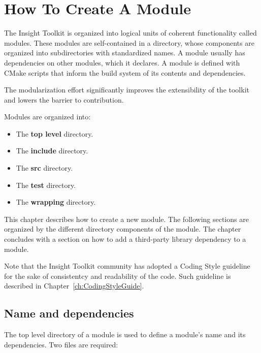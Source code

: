 \chapter{How To Create A Module}%
\label{chapter:CreateAModule}%

The Insight Toolkit is organized into logical units of coherent functionality called
modules. These modules are self-contained in a directory, whose components
are organized into subdirectories with standardized names. A module usually has
dependencies on other modules, which it declares. A module is defined with
CMake scripts that inform the build system of its contents and dependencies.

The modularization effort significantly improves the extensibility of the
toolkit and lowers the barrier to contribution.

Modules are organized into:

\begin{itemize}
  \item The \textbf{top level} directory.

  \item The \textbf{include} directory.

  \item The \textbf{src} directory.

  \item The \textbf{test} directory.

  \item The \textbf{wrapping} directory.
\end{itemize}

This chapter describes how to create a new module. The following sections  are
organized by the different directory components of the module. The chapter
concludes with a section on how to add a third-party library dependency to a
module.

Note that the Insight Toolkit community has adopted a Coding Style guideline
for the sake of consistentcy and readability of the code. Such guideline is
described in Chapter~\ref{ch:CodingStyleGuide}.

\section{Name and dependencies}%
\label{sec:NameAndDependencies}%

The top level directory of a module is used to define a module's name and its
dependencies. Two files are required:

